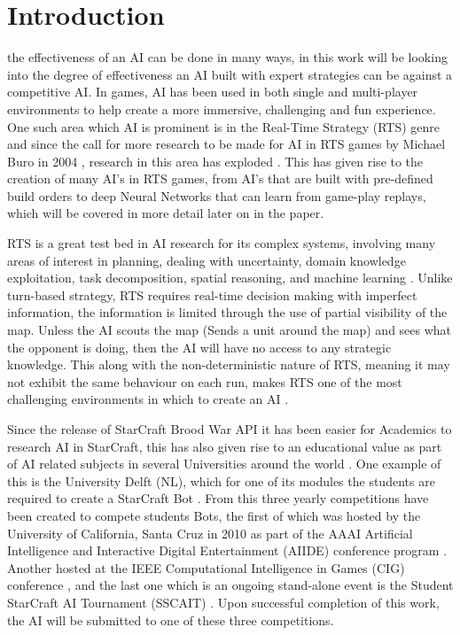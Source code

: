 \documentclass[journal]{IEEEtran}
\begin{document}
\section{Introduction}
 the effectiveness of an AI can be done in many ways, in this work will be looking into the degree of effectiveness an AI built with expert strategies can be against a competitive AI. %
In games, AI has been used in both single and multi-player environments to help create a more immersive, challenging and fun experience. One such area which AI is prominent is in the Real-Time Strategy (RTS) genre and since the call for more research to be made for AI in RTS games by Michael Buro in 2004 \cite{CallFor}, research in this area has exploded \cite{Survey}. This has given rise to the creation of many AI's in RTS games, from AI's that are built with pre-defined build orders \cite{Swen} to deep Neural Networks \cite{Deep} that can learn from game-play replays, which will be covered in more detail later on in the paper.

RTS is a great test bed in AI research for its complex systems, involving many areas of interest in planning, dealing with uncertainty, domain knowledge exploitation, task decomposition, spatial reasoning, and machine learning \cite{StarCraftBot}. Unlike turn-based strategy, RTS requires real-time decision making with imperfect information, the information is limited through the use of partial visibility of the map. Unless the AI scouts the map (Sends a unit around the map) and sees what the opponent is doing, then the AI will have no access to any strategic knowledge. This along with the non-deterministic nature of RTS, meaning it may not exhibit the same behaviour on each run, makes RTS one of the most challenging environments in which to create an AI \cite{Current}.

Since the release of StarCraft Brood War API it has been easier for Academics to research AI in StarCraft, this has also given rise to an educational value as part of AI related subjects in several Universities around the world \cite{Current}. One example of this is the University Delft (NL), which for one of its modules the students are required to create a StarCraft Bot \cite{NL}. From this three yearly competitions have been created to compete students Bots, the first of which was hosted by the University of California, Santa Cruz in 2010 as part of the AAAI Artificial Intelligence and Interactive Digital Entertainment (AIIDE) conference program \cite{AIIDE}. Another hosted at the IEEE Computational Intelligence in Games (CIG) conference \cite{CIG}, and the last one which is an ongoing stand-alone event is the Student StarCraft AI Tournament (SSCAIT) \cite{StarCraftBot}. Upon successful completion of this work, the AI will be submitted to one of these three competitions.
\end{document}
